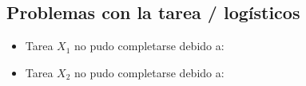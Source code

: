 \documentclass{article}
\begin{document}
\subsection{Problemas con la tarea / logísticos}
\label{sec:org9a2fbb1}

\begin{itemize}
\item Tarea \(X_1\) no pudo completarse debido a:
\item Tarea \(X_2\) no pudo completarse debido a:
\end{itemize}

\printbibliography
\end{document}
